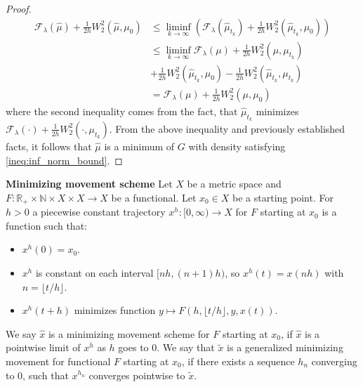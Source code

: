 \begin{proof}
\[
\begin{aligned}
\mathcal{F}_{\lambda}(\hat{\mu}) + \frac{1}{2h} W_2^2(\hat{\mu}, \mu_0)  & \leq \liminf_{k \rightarrow \infty} \left( \mathcal{F}_{\lambda}(\hat{\mu}_{t_k}) + \frac{1}{2h} W_2^2(\hat{\mu}_{t_k} , \mu_0) \right) \\
& \leq \liminf_{k \rightarrow \infty}  \mathcal{F}_{\lambda}(\mu) + \frac{1}{2h} W_2^2(\mu , \mu_{t_k})   \\
& + \frac{1}{2h}  W_2^2(\hat{\mu}_{t_k}, \mu_0) - \frac{1}{2h} W_2^2(\hat{\mu}_{t_k}, \mu_{t_k})   \\
& = \mathcal{F}_{\lambda} (\mu) + \frac{1}{2h} W_2^2(\mu, \mu_0) 
\end{aligned}
\]
where the second inequality comes from the fact, that $\hat{\mu}_{t_k}$ minimizes $\mathcal{F}_{\lambda}(\cdot) + \frac{1}{2h}W_2^2(\cdot, \mu_{t_k})$. From the above inequality and previously established facts, it follows that $\hat{\mu}$ is a minimum of $G$ with density satisfying \ref{ineq:inf_norm_bound}.
\end{proof}

\begin{definition} \textbf{Minimizing movement scheme}
Let $X$ be a metric space and $F : \mathbb{R_+} \times \mathbb{N} \times X \times X \rightarrow X$ be a functional. Let $x_0 \in X$ be a starting point. For $h> 0$ a piecewise constant trajectory $x^h : [0, \infty) \rightarrow X$ for $F$ starting at $x_0$ is a function such that:
\begin{itemize}
\item $x^h(0) = x_0$.
\item $x^h$ is constant on each interval $[nh, (n+1)h)$, so $x^h(t) = x(nh)$ with $n = \lfloor t/h \rfloor$.
\item $x^h(t +h )$ minimizes function $ y \mapsto F(h, \lfloor t/h \rfloor, y ,x(t))$.
\end{itemize}
We say $\hat{x}$ is a minimizing movement scheme for $F$ starting at $x_0$, if $\hat{x}$ is a pointwise limit of $x^h$ as $h$ goes to $0$. We say that $\tilde{x}$ is a generalized minimizing movement for functional $F$ starting at $x_0$, if there exists a sequence $h_n$ converging to $0$, such that $x^{h_n}$ converges pointwise to $\tilde{x}$.
\end{definition}

